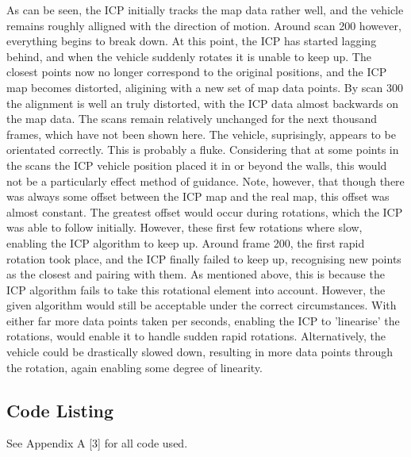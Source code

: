 		\newline
		\newline
		\pagebreak
		As can be seen, the ICP initially tracks the map data rather well, and the vehicle remains roughly alligned with the direction of motion. Around scan 200 however, everything begins to break down. At this point, the ICP has started lagging behind, and when the vehicle suddenly rotates it is unable to keep up. The closest points now no longer correspond to the original positions, and the ICP map becomes distorted, aligining with a new set of map data points. By scan 300 the alignment is well an truly distorted, with the ICP data almost backwards on the map data. The scans remain relatively unchanged for the next thousand frames, which have not been shown here. The vehicle, suprisingly, appears to be orientated correctly. This is probably a fluke.\newline \newline
		Considering that at some points in the scans the ICP vehicle position placed it in or beyond the walls, this would not be a particularly effect method of guidance.\newline \newline
		Note, however, that though there was always some offset between the ICP map and the real map, this offset was almost constant. The greatest offset would occur during rotations, which the ICP was able to follow initially. However, these first few rotations where slow, enabling the ICP algorithm to keep up. Around frame 200, the first rapid rotation took place, and the ICP finally failed to keep up, recognising new points as the closest and pairing with them.\newline
		As mentioned above, this is because the ICP algorithm fails to take this rotational element into account. However, the given algorithm would still be acceptable under the correct circumstances. With either far more data points taken per seconds, enabling the ICP to 'linearise' the rotations, would enable it to handle sudden rapid rotations. Alternatively, the vehicle could be drastically slowed down, resulting in more data points through the rotation, again enabling some degree of linearity.
		\newline
		

		
	\pagebreak

	\subsection*{Code Listing}
	See Appendix A [3] for all code used.
	
	\pagebreak

